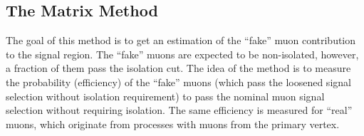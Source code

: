 % 

\subsection{The Matrix Method}
\label{subsec:matrix_method}
The goal of this method is to get an estimation of the ``fake'' muon contribution to the signal region.
The ``fake'' muons are expected to be non-isolated, however, a fraction of them pass the isolation cut. 
The idea of the method is to measure the probability (efficiency) of the ``fake'' muons
(which pass the loosened signal selection without isolation requirement) to pass the nominal muon signal selection without requiring isolation.
The same efficiency is measured for ``real'' muons, which originate from processes with muons from the primary vertex.

